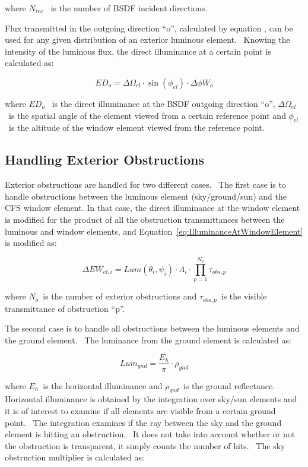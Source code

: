 where \({N_{inc}}\) ~is the number of BSDF incident directions.

Flux transmitted in the outgoing direction ``o'', calculated by equation , can be used for any given distribution of an exterior luminous element.~ Knowing the intensity of the luminous flux, the direct illuminance at a certain point is calculated as:

\begin{equation}
E{D_o} = \Delta {\Omega_{el}} \cdot \sin ({\phi_{el}}) \cdot \Delta \phi {W_o}
\end{equation}

where \(E{D_o}\) ~is the direct illuminance at the BSDF outgoing direction ``o'', \(\Delta {\Omega_{el}}\) ~is the spatial angle of the element viewed from a certain reference point and \({\phi_{el}}\) ~is the altitude of the window element viewed from the reference point.

\subsection{Handling Exterior Obstructions}\label{handling-exterior-obstructions}

Exterior obstructions are handled for two different cases.~ The first case is to handle obstructions between the luminous element (sky/ground/sun) and the CFS window element. In that case, the direct illuminance at the window element is modified for the product of all the obstruction transmittances between the luminous and window elements, and Equation~\ref{eq:IlluminanceAtWindowElement} is modified as:

\begin{equation}
\Delta E{W_{el,i}} = Lum({\theta_i},{\psi_i}) \cdot {\Lambda_i} \cdot \prod\limits_{p = 1}^{{N_o}} {{\tau_{obs,p}}}
\end{equation}

where \({N_o}\)~is the number of exterior obstructions and \({\tau_{obs,p}}\)~is the visible transmittance of obstruction ``p''.

The second case is to handle all obstructions between the luminous elements and the ground element.~ The luminance from the ground element is calculated as:

\begin{equation}
Lu{m_{gnd}} = \frac{{{E_h}}}{\pi } \cdot {\rho_{gnd}}
\end{equation}

where \({E_h}\)~is the horizontal illuminance and \({\rho_{gnd}}\)~is the ground reflectance.~ Horizontal illuminance is obtained by the integration over sky/sun elements and it is of interest to examine if all elements are visible from a certain ground point.~ The integration examines if the ray between the sky and the ground element is hitting an obstruction.~ It does not take into account whether or not the obstruction is transparent, it simply counts the number of hits.~ The sky obstruction multiplier is calculated as:

